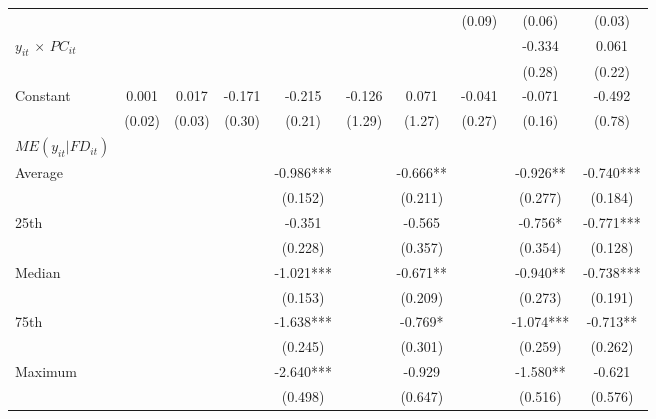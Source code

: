 \documentclass[12pt, a4paper]{article}
\begin{document}
\begin{table}
\begin{threeparttable}
{\begin{tabular}{l*{9}{c}}
				&                     &                     &                     &                     &                     &                     &      (0.09)         &      (0.06)         &      (0.03)         \\
				$y_{it}$ $\times$ $PC_{it}$ &                     &                     &                     &                     &                     &                     &                     &      -0.334         &       0.061         \\
				&                     &                     &                     &                     &                     &                     &                     &      (0.28)         &      (0.22)         \\
				Constant            &       0.001         &       0.017         &      -0.171         &      -0.215         &      -0.126         &       0.071         &      -0.041         &      -0.071         &      -0.492         \\
				&      (0.02)         &      (0.03)         &      (0.30)         &      (0.21)         &      (1.29)         &      (1.27)         &      (0.27)         &      (0.16)         &      (0.78)         \\
				\hline
				$ME(y_{it}|FD_{it})$ \\
				Average&&&&	-0.986*** &&		-0.666** 	&&	-0.926** &		-0.740***\\
				&&&&(0.152)   	&&	(0.211)   &&		(0.277)   	&	(0.184)   \\
				
				25th&&&&	-0.351   &&		-0.565   &&		-0.756*  	&	-0.771***\\
				&&&&(0.228)   &&		(0.357)   &&		(0.354)   &		(0.128)   \\
				
				Median&&&&	-1.021***	&&	-0.671** 	&&	-0.940** 	&	-0.738***\\
				&&&&(0.153)  && 		(0.209)   &&		(0.273)   	&	(0.191)   \\
				
				75th&&&&	-1.638***	&&	-0.769*  	&&	-1.074***	&	-0.713** \\
				&&&&(0.245)   &&		(0.301)   &&		(0.259)   	&	(0.262)   \\
				
				Maximum&&&&	-2.640***	&&	-0.929   &&		-1.580** &		-0.621   \\
				&&&&(0.498)  && 		(0.647)   &&		(0.516)   &		(0.576)   \\
				

\end{tabular}}
\end{threeparttable}
\end{table}
\end{document}
